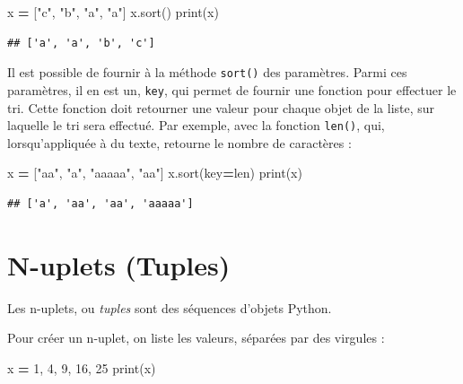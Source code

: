 \documentclass[
  12pt,
]{book}
\newenvironment{Shaded}{\begin{snugshade}}{\end{snugshade}}
\newcommand{\BuiltInTok}[1]{#1}
\newcommand{\DecValTok}[1]{\textcolor[rgb]{0.00,0.00,0.81}{#1}}
\newcommand{\NormalTok}[1]{#1}
\newcommand{\OperatorTok}[1]{\textcolor[rgb]{0.81,0.36,0.00}{\textbf{#1}}}
\newcommand{\StringTok}[1]{\textcolor[rgb]{0.31,0.60,0.02}{#1}}
\numberwithin{equation}{section}
\numberwithin{countremarque}{section}
\begin{document}
\begin{Shaded}
\begin{Highlighting}[]
\NormalTok{x }\OperatorTok{=}\NormalTok{ [}\StringTok{"c"}\NormalTok{, }\StringTok{"b"}\NormalTok{, }\StringTok{"a"}\NormalTok{, }\StringTok{"a"}\NormalTok{]}
\NormalTok{x.sort()}
\BuiltInTok{print}\NormalTok{(x)}
\end{Highlighting}
\end{Shaded}

\begin{lstlisting}
## ['a', 'a', 'b', 'c']
\end{lstlisting}

Il est possible de fournir à la méthode \texttt{sort()} des paramètres. Parmi ces paramètres, il en est un, \texttt{key}, qui permet de fournir une fonction pour effectuer le tri. Cette fonction doit retourner une valeur pour chaque objet de la liste, sur laquelle le tri sera effectué. Par exemple, avec la fonction \texttt{len()}, qui, lorsqu'appliquée à du texte, retourne le nombre de caractères :

\begin{Shaded}
\begin{Highlighting}[]
\NormalTok{x }\OperatorTok{=}\NormalTok{ [}\StringTok{"aa"}\NormalTok{, }\StringTok{"a"}\NormalTok{, }\StringTok{"aaaaa"}\NormalTok{, }\StringTok{"aa"}\NormalTok{]}
\NormalTok{x.sort(key}\OperatorTok{=}\BuiltInTok{len}\NormalTok{)}
\BuiltInTok{print}\NormalTok{(x)}
\end{Highlighting}
\end{Shaded}

\begin{lstlisting}
## ['a', 'aa', 'aa', 'aaaaa']
\end{lstlisting}

\section{N-uplets (Tuples)}\label{n-uplets-tuples}

Les n-uplets, ou \emph{tuples} sont des séquences d'objets Python.

Pour créer un n-uplet, on liste les valeurs, séparées par des virgules :

\begin{Shaded}
\begin{Highlighting}[]
\NormalTok{x }\OperatorTok{=} \DecValTok{1}\NormalTok{, }\DecValTok{4}\NormalTok{, }\DecValTok{9}\NormalTok{, }\DecValTok{16}\NormalTok{, }\DecValTok{25}
\BuiltInTok{print}\NormalTok{(x)}
\end{Highlighting}
\end{Shaded}
\end{document}
